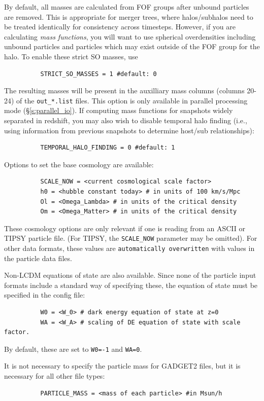 \documentclass[12pt]{article}
\begin{document}
      By default, all masses are calculated from FOF groups after
      unbound particles are removed.  This is appropriate for merger trees,
      where halos/subhalos need to be treated identically for consistency
      across timesteps.  However, if you are calculating \textit{mass functions},
      you will want to use spherical overdensities including unbound particles
      and particles which may exist outside of the FOF group for the halo.
      To enable these strict SO masses, use
\begin{verbatim}
          STRICT_SO_MASSES = 1 #default: 0
\end{verbatim}
      The resulting masses will be present in the auxilliary mass columns
      (columns 20-24) of the \texttt{out\_*.list} files.  This option is only available in parallel processing mode (\S \ref{s:parallel_io}).  If computing mass functions for snapshots widely separated in redshift, you may also wish to disable temporal halo finding (i.e., using information from previous snapshots to determine host/sub relationships):
\begin{verbatim}
          TEMPORAL_HALO_FINDING = 0 #default: 1
\end{verbatim}
      Options to set the base cosmology are available:
\begin{verbatim}
          SCALE_NOW = <current cosmological scale factor>
          h0 = <hubble constant today> # in units of 100 km/s/Mpc
          Ol = <Omega_Lambda> # in units of the critical density
          Om = <Omega_Matter> # in units of the critical density
\end{verbatim}
      These cosmology options are only relevant if one is reading from an ASCII
      or TIPSY particle file.  (For TIPSY, the \texttt{SCALE\_NOW} parameter may be
      omitted).  For other data formats, these values are \texttt{automatically
      overwritten} with values in the particle data files.

       Non-LCDM equations of state are also available.  Since none of the particle input formats include a standard way of specifying these, the equation of state must be specified in the config file:
\begin{verbatim}      
          W0 = <W_0> # dark energy equation of state at z=0
          WA = <W_A> # scaling of DE equation of state with scale factor.
\end{verbatim}
	By default, these are set to \texttt{W0=-1} and \texttt{WA=0}.

      It is not necessary to specify the particle mass for GADGET2 files, but it is necessary for all other file types:
\begin{verbatim}
          PARTICLE_MASS = <mass of each particle> #in Msun/h
\end{verbatim}
\end{document}
